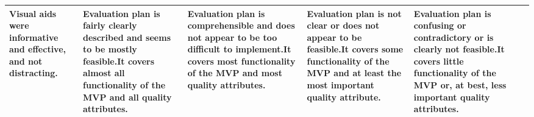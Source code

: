 \documentclass{csse4400}
\begin{document}
\begin{landscape}
\begin{xltabular}{\linewidth}{| p{2cm} | X | X | X | X | X |}
Visual aids were informative and effective, and not distracting. &
Evaluation plan is fairly clearly described and seems to be mostly feasible.\newline\newline It covers almost all functionality of the MVP and all quality attributes. &
Evaluation plan is comprehensible and does not appear to be too difficult to implement.\newline\newline It covers most functionality of the MVP and most quality attributes. &
Evaluation plan is not clear or does not appear to be feasible.\newline\newline\newline It covers some functionality of the MVP and at least the most important quality attribute. &
Evaluation plan is confusing or contradictory or is clearly not feasible.\newline\newline It covers little functionality of the MVP or, at best, less important quality attributes. \\
\hline

\end{xltabular}
\end{landscape}
\end{document}
